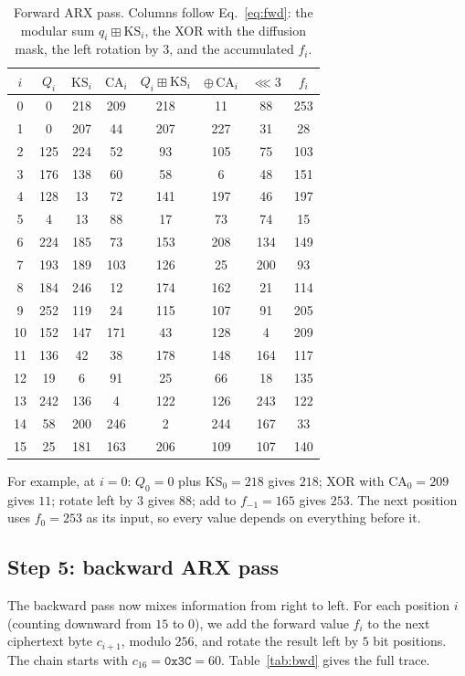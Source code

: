 \documentclass[pdflatex,sn-mathphys-num]{sn-jnl}%
\theoremstyle{thmstyleone}%
\theoremstyle{thmstyletwo}%
\theoremstyle{thmstylethree}%
\begin{document}
\begin{table}[htbp]
\centering
\caption{Forward ARX pass. Columns follow Eq.~\eqref{eq:fwd}: the modular sum $q_i\boxplus\mathrm{KS}_i$, the XOR with the diffusion mask, the left rotation by $3$, and the accumulated $f_i$.}
\label{tab:fwd}
\small
\begin{tabular}{cccccccc}
\toprule
$i$ & $Q_i$ & $\mathrm{KS}_i$ & $\mathrm{CA}_i$ & $Q_i\boxplus\mathrm{KS}_i$ & $\oplus\,\mathrm{CA}_i$ & $\lll 3$ & $f_i$ \\
\midrule
0 & 0 & 218 & 209 & 218 & 11 & 88 & 253 \\
1 & 0 & 207 & 44 & 207 & 227 & 31 & 28 \\
2 & 125 & 224 & 52 & 93 & 105 & 75 & 103 \\
3 & 176 & 138 & 60 & 58 & 6 & 48 & 151 \\
4 & 128 & 13 & 72 & 141 & 197 & 46 & 197 \\
5 & 4 & 13 & 88 & 17 & 73 & 74 & 15 \\
6 & 224 & 185 & 73 & 153 & 208 & 134 & 149 \\
7 & 193 & 189 & 103 & 126 & 25 & 200 & 93 \\
8 & 184 & 246 & 12 & 174 & 162 & 21 & 114 \\
9 & 252 & 119 & 24 & 115 & 107 & 91 & 205 \\
10 & 152 & 147 & 171 & 43 & 128 & 4 & 209 \\
11 & 136 & 42 & 38 & 178 & 148 & 164 & 117 \\
12 & 19 & 6 & 91 & 25 & 66 & 18 & 135 \\
13 & 242 & 136 & 4 & 122 & 126 & 243 & 122 \\
14 & 58 & 200 & 246 & 2 & 244 & 167 & 33 \\
15 & 25 & 181 & 163 & 206 & 109 & 107 & 140 \\
\bottomrule
\end{tabular}
\end{table}

For example, at $i=0$: $Q_0=0$ plus $\mathrm{KS}_0=218$ gives $218$; XOR with $\mathrm{CA}_0=209$ gives $11$; rotate left by $3$ gives $88$; add to $f_{-1}=165$ gives $253$. The next position uses $f_0=253$ as its input, so every value depends on everything before it.

\subsection{Step 5: backward ARX pass}

The backward pass now mixes information from right to left. For each position $i$ (counting downward from $15$ to $0$), we add the forward value $f_i$ to the next ciphertext byte $c_{i+1}$, modulo $256$, and rotate the result left by $5$ bit positions. The chain starts with $c_{16}=\texttt{0x3C}=60$. Table~\ref{tab:bwd} gives the full trace.
\end{document}
